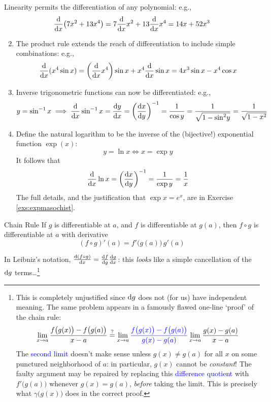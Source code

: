 \begin{examples}{}{}
	\exstart Linearity permits the differentiation of any polynomial: e.g.,
	\[
		\diff x\big(7x^2+13x^4\big)=7\diff xx^2+13\diff xx^4=14x+52x^3
	\]
	\begin{enumerate}\setcounter{enumi}{1}
		\item The product rule extends the reach of differentiation to include simple combinations: e.g.,
		\[
			\diff x(x^4\sin x) =\left(\diff xx^4\right)\sin x+x^4\diff x\sin x = 4x^3\sin x-x^4\cos x
		\]
		
		\item Inverse trigonometric functions can now be differentiated: e.g.,
		\[
			y=\sin^{-1}x\implies 
			\diff x\sin^{-1}x=\diff[y]{x}
			=\left(\diff[x]{y}\right)^{-1}
			=\frac 1{\cos y}
			=\frac 1{\sqrt{1-\sin^2\!y}}
			=\frac 1{\sqrt{1-x^2}}
		\]
		
		\item Define the natural logarithm to be the inverse of the (bijective!) exponential function $\exp(x)$:
		\[
			y=\ln x\iff x=\exp y
		\]
		It follows that
		\[
			\diff x\ln x=\left(\diff[x]{y}\right)^{-1}
			=\frac 1{\exp y}=\frac 1x
		\]
		The full details, and the justification that $\exp x=e^x$, are in Exercise \ref{exs:expmasochist}.
	\end{enumerate}
\end{examples}
\goodbreak


\begin{thm}{Chain Rule}{}
	If $g$ is differentiable at $a$, and $f$ is differentiable at $g(a)$, then $f\circ g$ is differentiable at $a$ with derivative
	\[
		(f\circ g)'(a)=f'\big(g(a)\big)\,g'(a)
	\]
\end{thm}

In Leibniz's notation, $\diff[(f\circ g)]{x}=\diff[f]{g}\diff[g]{x}$: this \emph{looks} like a simple cancellation of the $\dg$ terms\ldots\footnote{%
	This is completely unjustified since $\dg$ does not (for us) have independent meaning. The same problem appears in a famously flawed one-line `proof' of the chain rule:
	\[
		\lim_{x\to a}\frac{f\big(g(x)\big)-f\big(g(a)\big)}{x-a} 
		\overset{\text{?}}{=} \lim_{x\to a}\textcolor{blue}{\frac{f\big(g(x)\big)-f\big(g(a)\big)}{g(x)-g(a)}} \lim_{x\to a}\frac{g(x)-g(a)}{x-a}
	\]
	The \textcolor{blue}{second limit} doesn't make sense unless $g(x)\neq g(a)$ for all $x$ on some punctured neighborhood of $a$: in particular, $g(x)$ cannot be \emph{constant}! The faulty argument may be repaired by replacing this \textcolor{blue}{difference quotient} with $f'\bigl(g(a)\bigr)$ whenever $g(x)=g(a)$, \emph{before} taking the limit. This is precisely what $\gamma\bigl(g(x)\bigr)$ does in the correct proof.%
}



